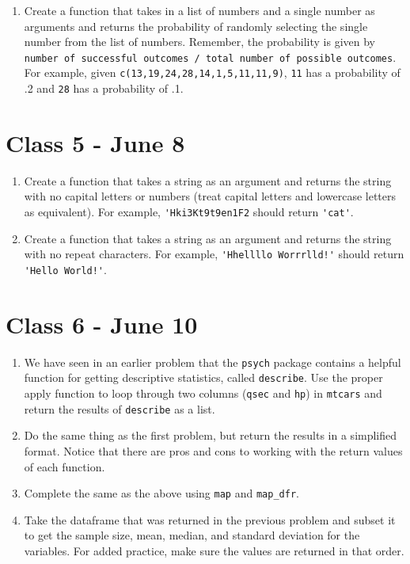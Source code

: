 \documentclass[letterpaper,12pt]{article}
\begin{document}
\begin{enumerate}
    \item Create a function that takes in a list of numbers and a single number as arguments and returns the probability of randomly selecting the single number from the list of numbers. 
    Remember, the probability is given by \\
    \verb|number of successful outcomes / total number of possible outcomes|. 
    For example, given \verb|c(13,19,24,28,14,1,5,11,11,9)|, \verb|11| has a probability of .2 and \verb|28| has a probability of .1. 
\end{enumerate}

\section{Class 5 - June 8}

\begin{enumerate}
    \item Create a function that takes a string as an argument and returns the string with no capital letters or numbers (treat capital letters and lowercase letters as equivalent).
    For example, \verb|'Hki3Kt9t9en1F2| should return \verb|'cat'|.
    \item Create a function that takes a string as an argument and returns the string with no repeat characters.
    For example, \verb|'Hhellllo Worrrlld!'| should return \verb|'Hello World!'|.
\end{enumerate}

\section{Class 6 - June 10}

\begin{enumerate}
    \item  We have seen in an earlier problem that the \verb|psych| package contains a helpful function for getting descriptive statistics, called \verb|describe|. 
    Use the proper apply function to loop through two columns (\verb|qsec| and \verb|hp|) in \verb|mtcars| and return the results of \verb|describe| as a list.
    \item Do the same thing as the first problem, but return the results in a simplified format. 
    Notice that there are pros and cons to working with the return values of each function.
    \item Complete the same as the above using \verb|map| and \verb|map_dfr|.
    \item Take the dataframe that was returned in the previous problem and subset it to get the sample size, mean, median, and standard deviation for the variables. 
    For added practice, make sure the values are returned in that order. 
\end{enumerate}
\end{document}
